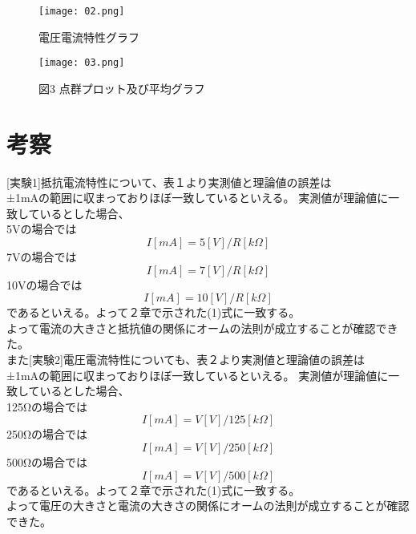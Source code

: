 \documentclass[titlepage]{jarticle}
\begin{document}
\begin{figure}[H]
    \begin{center}
        \texttt{[image: 02.png]}
        \caption{電圧電流特性グラフ}
    \end{center}
\end{figure}

\begin{figure}[H]
    \begin{center}
        \texttt{[image: 03.png]}
        \caption{図3 点群プロット及び平均グラフ}
    \end{center}
\end{figure}

\section{考察}
[実験1]抵抗電流特性について、表１より実測値と理論値の誤差は\\
±1mAの範囲に収まっておりほぼ一致しているといえる。
実測値が理論値に一致しているとした場合、\\
5Vの場合では
\begin{equation}
    I[mA]=5[V]/R[kΩ]
\end{equation}
7Vの場合では
\begin{equation}
    I[mA]=7[V]/R[kΩ]
\end{equation}
10Vの場合では
\begin{equation}
    I[mA]=10[V]/R[kΩ]
\end{equation}
であるといえる。よって２章で示された(1)式に一致する。\\
よって電流の大きさと抵抗値の関係にオームの法則が成立することが確認できた。\\

また[実験2]電圧電流特性についても、表２より実測値と理論値の誤差は\\
±1mAの範囲に収まっておりほぼ一致しているといえる。
実測値が理論値に一致しているとした場合、\\
125Ωの場合では
\begin{equation}
    I[mA]=V[V]/125[kΩ]
\end{equation}
250Ωの場合では
\begin{equation}
    I[mA]=V[V]/250[kΩ]
\end{equation}
500Ωの場合では
\begin{equation}
    I[mA]=V[V]/500[kΩ]
\end{equation}
であるといえる。よって２章で示された(1)式に一致する。\\
よって電圧の大きさと電流の大きさの関係にオームの法則が成立することが確認できた。\\
\end{document}
